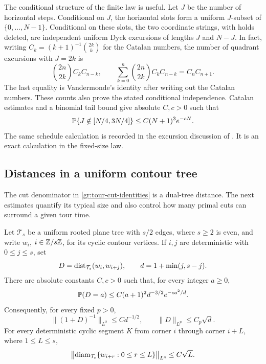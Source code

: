 The conditional structure of the finite law is useful.  Let $J$
be the number of horizontal steps.  Conditional on $J$, the horizontal
slots form a uniform $J$-subset of $\{0,\ldots,N-1\}$.  Conditional
on these slots, the two coordinate strings, with holds deleted, are
independent uniform Dyck excursions of lengths $J$ and $N-J$.
In fact, writing $C_k=(k+1)^{-1}\binom{2k}{k}$ for the Catalan
numbers, the number of quadrant excursions with $J=2k$ is
\begin{equation}\label{gr:schedule-count}
 \binom{2n}{2k}C_kC_{n-k},
 \qquad
 \sum_{k=0}^n\binom{2n}{2k}C_kC_{n-k}=C_nC_{n+1}.
\end{equation}
The last equality is Vandermonde's identity after writing out the
Catalan numbers.  These counts also prove the stated conditional
independence.  Catalan estimates and a binomial tail bound give
absolute $C,c>0$ such that
\begin{equation}\label{gr:count-tail}
 \P\{J\notin[N/4,3N/4]\}\leq C(N+1)^3e^{-cN}.
\end{equation}
The same schedule calculation is recorded in the excursion discussion
of \cite[Section~``From tree excursions to the measured quantum
sphere'']{MetricMaps}.  It is an exact calculation in the fixed-size
law.

\subsection{Distances in a uniform contour tree}

The cut denominator in \eqref{gr:tour-cut-identities} is a dual-tree
distance.  The next estimates quantify its typical size and also
control how many primal cuts can surround a given tour time.

\begin{lemma}
\label{gr:dyck}
Let $\mathcal T_s$ be a uniform rooted plane tree with $s/2$ edges,
where $s\geq2$ is even, and write $w_i$, $i\in\Z/s\Z$, for its
cyclic contour vertices.  If $i,j$ are deterministic with
$0\leq j\leq s$, set
\[
 D=\dist_{\mathcal T_s}(w_i,w_{i+j}),
 \qquad d=1+\min(j,s-j).
\]
There are absolute constants $C,c>0$ such that, for every integer
$a\geq0$,
\begin{equation}\label{gr:dyck-density}
 \P(D=a)\leq C(a+1)^2d^{-3/2}e^{-ca^2/d}.
\end{equation}
Consequently, for every fixed $p>0$,
\begin{equation}\label{gr:dyck-moments}
 \|(1+D)^{-1}\|_{L^2}\leq C d^{-1/2},
 \qquad \|D\|_{L^p}\leq C_p\sqrt d.
\end{equation}
For every deterministic cyclic segment $K$ from corner $i$ through
corner $i+L$, where $1\leq L\leq s$,
\begin{equation}\label{gr:contour-diameter}
 \bigl\|\diam_{\mathcal T_s}\{w_{i+r}:0\leq r\leq L\}\bigr\|_{L^4}
       \leq C\sqrt L.
\end{equation}
\end{lemma}

